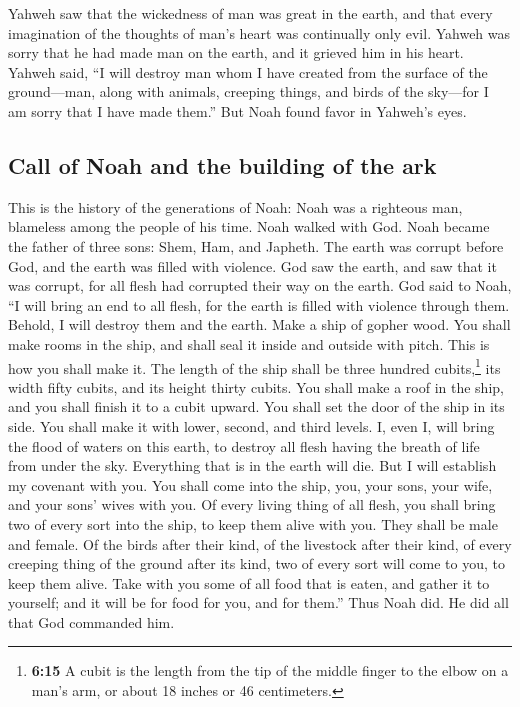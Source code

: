  Yahweh saw that the wickedness of man was great in the
earth, and that every imagination of the thoughts of man's heart was
continually only evil.  Yahweh was sorry that he had made
man on the earth, and it grieved him in his heart.  Yahweh
said, ``I will destroy man whom I have created from the surface of the
ground---man, along with animals, creeping things, and birds of the
sky---for I am sorry that I have made them.''  But Noah
found favor in Yahweh's eyes.

\hypertarget{call-of-noah-and-the-building-of-the-ark}{%
\subsection{Call of Noah and the building of the
ark}\label{call-of-noah-and-the-building-of-the-ark}}

 This is the history of the generations of Noah: Noah was
a righteous man, blameless among the people of his time. Noah walked
with God.  Noah became the father of three sons: Shem,
Ham, and Japheth.  The earth was corrupt before God, and
the earth was filled with violence.  God saw the earth,
and saw that it was corrupt, for all flesh had corrupted their way on
the earth.  God said to Noah, ``I will bring an end to
all flesh, for the earth is filled with violence through them. Behold, I
will destroy them and the earth.  Make a ship of gopher
wood. You shall make rooms in the ship, and shall seal it inside and
outside with pitch.  This is how you shall make it. The
length of the ship shall be three hundred cubits,\footnote{\textbf{6:15}
  A cubit is the length from the tip of the middle finger to the elbow
  on a man's arm, or about 18 inches or 46 centimeters.} its width fifty
cubits, and its height thirty cubits.  You shall make a
roof in the ship, and you shall finish it to a cubit upward. You shall
set the door of the ship in its side. You shall make it with lower,
second, and third levels.  I, even I, will bring the
flood of waters on this earth, to destroy all flesh having the breath of
life from under the sky. Everything that is in the earth will die.
 But I will establish my covenant with you. You shall
come into the ship, you, your sons, your wife, and your sons' wives with
you.  Of every living thing of all flesh, you shall bring
two of every sort into the ship, to keep them alive with you. They shall
be male and female.  Of the birds after their kind, of
the livestock after their kind, of every creeping thing of the ground
after its kind, two of every sort will come to you, to keep them alive.
 Take with you some of all food that is eaten, and gather
it to yourself; and it will be for food for you, and for them.''
 Thus Noah did. He did all that God commanded him.

